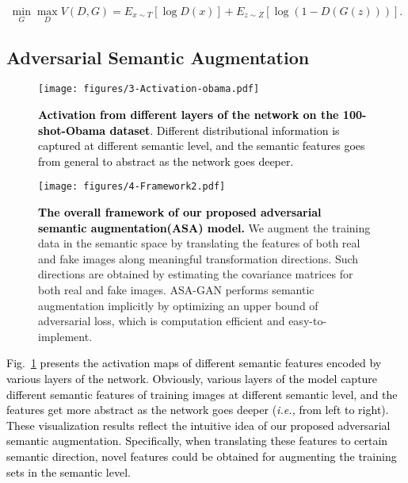 \documentclass[10pt,journal,compsoc]{IEEEtran}
\newcommand{\revise}[1]{\textcolor{black}{#1}}
\begin{document}
\begin{equation}
\min _{G} \max _{D} V(D, G)=E_{x \sim T} [\log D(x)]+E_{z \sim Z}[\log (1-D(G(z)))].
\end{equation}


\subsection{Adversarial Semantic Augmentation}

\begin{figure}
  \centering
  \texttt{[image: figures/3-Activation-obama.pdf]}
  \caption{
  \revise{\textbf{Activation from different layers of the network on the 100-shot-Obama dataset}.
  Different distributional information is captured at different semantic level, and the semantic features goes from general to abstract as the network goes deeper.
  }}
  \label{fig:activation-obama}
  \vspace{-4mm}
\end{figure}


\begin{figure*}
  \centering
  \texttt{[image: figures/4-Framework2.pdf]}
  \caption{\textbf{\revise{The overall framework of our proposed adversarial semantic augmentation(ASA) model.}}
  We augment the training data in the semantic space by translating the features of both real and fake images along meaningful transformation directions.
  Such directions are obtained by estimating the covariance matrices for both real and fake images.
  ASA-GAN performs semantic augmentation implicitly by optimizing an upper bound of adversarial loss, which is computation efficient and easy-to-implement.
  }
  \label{Framework}
  \vspace{-4mm}
\end{figure*}

\revise{
Fig.~\ref{fig:activation-obama} presents the activation maps of different semantic features encoded by various layers of the network.
%
Obviously, various layers of the model capture different semantic features of training images at different semantic level, and the features get more abstract as the network goes deeper (\emph{i.e.,} from left to right).
%
These visualization results reflect the intuitive idea of our proposed adversarial semantic augmentation. 
%
Specifically, when translating these features to certain semantic direction, novel features could be obtained for augmenting the training sets in the semantic level.
%
}
%
\end{document}
